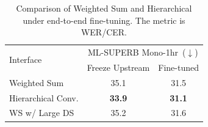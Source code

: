 \begin{table}[th]
\scriptsize
\vspace{-5pt}
  \caption{Comparison of Weighted Sum and Hierarchical under end-to-end fine-tuning. The metric is WER/CER.}
  \label{tab:finetune}
  \centering
  \begin{tabular}{ l c c }
    \toprule
     \multirow{ 2}{*}{Interface} & \multicolumn{2}{c}{ML-SUPERB Mono-1hr~($\downarrow$)}    \\
      & Freeze Upstream & Fine-tuned \\
    \midrule
    
    Weighted Sum &     35.1 & 31.5 \\
     
     Hierarchical Conv. &  \textbf{33.9} & \textbf{31.1} \\
      WS w/ Large DS &       35.2 & 31.6 \\

    \bottomrule
  \end{tabular}
  \vspace{-5pt}
\end{table}


